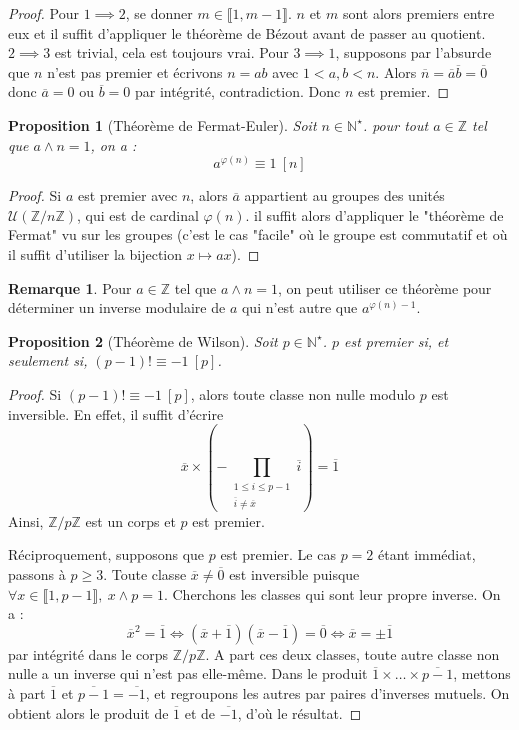 \documentclass[french]{book}
\newcommand{\N}{\mathbb{N}}
\newcommand{\Z}{\mathbb{Z}}
\newcommand{\st}{^\star}
\theoremstyle{plain}
\newtheorem{prop}{Proposition}[chapter]
\theoremstyle{definition}
\newtheorem{rmq}{Remarque}[chapter]
\theoremstyle{remark}
\begin{document}
\begin{proof}
	Pour $1\implies2$, se donner $m\in\llbracket1,m-1\rrbracket$. $n$ et $m$ sont alors premiers entre eux et il suffit d'appliquer le théorème de Bézout avant de passer au quotient. $2\implies3$ est trivial, cela est toujours vrai. Pour $3\implies1$, supposons par l'absurde que $n$ n'est pas premier et écrivons $n=ab$ avec $1<a,b<n$. Alors $\overline{n}=\overline{a}\overline{b}=\overline{0}$ donc $\overline{a}=0$ ou $\overline{b}=0$ par intégrité, contradiction. Donc $n$ est premier.
\end{proof}
\begin{prop}[Théorème de Fermat-Euler]
	Soit $n\in\N\st$. pour tout $a\in\Z$ tel que $a\wedge n=1$, on a : $$a^{\varphi(n)}\equiv 1\ [n]$$
\end{prop}
\begin{proof}
	Si $a$ est premier avec $n$, alors $\overline{a}$ appartient au groupes des unités $\mathcal{U}\left(\Z/n\Z\right)$, qui est de cardinal $\varphi(n)$. il suffit alors d'appliquer le "théorème de Fermat" vu sur les groupes (c'est le cas "facile" où le groupe est commutatif et où il suffit d'utiliser la bijection $x\mapsto ax$).
\end{proof}
\begin{rmq}
	Pour $a\in\Z$ tel que $a\wedge n=1$, on peut utiliser ce théorème pour déterminer un inverse modulaire de $a$ qui n'est autre que $a^{\varphi(n)-1}$.
\end{rmq}
\begin{prop}[Théorème de Wilson]
	Soit $p\in\N\st$. $p$ est premier si, et seulement si, $(p-1)!\equiv-1\ [p]$.
\end{prop}
\begin{proof}
	Si $(p-1)!\equiv -1\ [p]$, alors toute classe non nulle modulo $p$ est inversible. En effet, il suffit d'écrire $$\overline{x}\times\left(-\prod_{\substack{1\leqslant i \leqslant p-1 \\ \overline{i}\ne\overline{x}}}\overline{i}\right)=\overline{1}$$ Ainsi, $\Z/p\Z$ est un corps et $p$ est premier. \par Réciproquement, supposons que $p$ est premier. Le cas $p=2$ étant immédiat, passons à $p\geqslant3$. Toute classe $\overline{x}\ne\overline{0}$ est inversible puisque $\forall x\in\llbracket1,p-1\rrbracket,\ x\wedge p=1$. Cherchons les classes qui sont leur propre inverse. On a : $$\overline{x}^2=\overline{1}\iff(\overline{x}+\overline{1})(\overline{x}-\overline{1})=\overline{0}\iff \overline{x}=\pm\overline{1}$$ par intégrité dans le corps $\Z/p\Z$. A part ces deux classes, toute autre classe non nulle a un inverse qui n'est pas elle-même. Dans le produit $\overline{1}\times\ldots\times\overline{p-1}$, mettons à part $\overline{1}$ et $\overline{p-1}=\overline{-1}$, et regroupons les autres par paires d'inverses mutuels. On obtient alors le produit de $\overline{1}$ et de $\overline{-1}$, d'où le résultat.
\end{proof}
\end{document}

